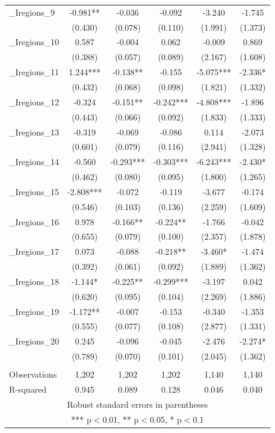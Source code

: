 \documentclass[]{article}
\begin{document}
\begin{tabular}{lccccc}
\_Iregions\_9 & -0.981** & -0.036 & -0.092 & -3.240 & -1.745 \\
 & (0.430) & (0.078) & (0.110) & (1.991) & (1.373) \\
\_Iregions\_10 & 0.587 & -0.004 & 0.062 & -0.009 & 0.869 \\
 & (0.388) & (0.057) & (0.089) & (2.167) & (1.608) \\
\_Iregions\_11 & 1.244*** & -0.138** & -0.155 & -5.075*** & -2.336* \\
 & (0.432) & (0.068) & (0.098) & (1.821) & (1.332) \\
\_Iregions\_12 & -0.324 & -0.151** & -0.242*** & -4.808*** & -1.896 \\
 & (0.443) & (0.066) & (0.092) & (1.833) & (1.333) \\
\_Iregions\_13 & -0.319 & -0.069 & -0.086 & 0.114 & -2.073 \\
 & (0.601) & (0.079) & (0.116) & (2.941) & (1.328) \\
\_Iregions\_14 & -0.560 & -0.293*** & -0.303*** & -6.243*** & -2.430* \\
 & (0.462) & (0.080) & (0.095) & (1.800) & (1.265) \\
\_Iregions\_15 & -2.808*** & -0.072 & -0.119 & -3.677 & -0.174 \\
 & (0.546) & (0.103) & (0.136) & (2.259) & (1.609) \\
\_Iregions\_16 & 0.978 & -0.166** & -0.224** & -1.766 & -0.042 \\
 & (0.655) & (0.079) & (0.100) & (2.357) & (1.878) \\
\_Iregions\_17 & 0.073 & -0.088 & -0.218** & -3.460* & -1.474 \\
 & (0.392) & (0.061) & (0.092) & (1.889) & (1.362) \\
\_Iregions\_18 & -1.144* & -0.225** & -0.299*** & -3.197 & 0.042 \\
 & (0.620) & (0.095) & (0.104) & (2.269) & (1.886) \\
\_Iregions\_19 & -1.172** & -0.007 & -0.153 & -0.340 & -1.353 \\
 & (0.555) & (0.077) & (0.108) & (2.877) & (1.331) \\
\_Iregions\_20 & 0.245 & -0.096 & -0.045 & -2.476 & -2.274* \\
 & (0.789) & (0.070) & (0.101) & (2.045) & (1.362) \\
 &  &  &  &  &  \\
Observations & 1,202 & 1,202 & 1,202 & 1,140 & 1,140 \\
 R-squared & 0.945 & 0.089 & 0.128 & 0.046 & 0.040 \\ \hline
\multicolumn{6}{c}{ Robust standard errors in parentheses} \\
\multicolumn{6}{c}{ *** p$<$0.01, ** p$<$0.05, * p$<$0.1} \\
\end{tabular}
\end{document}
